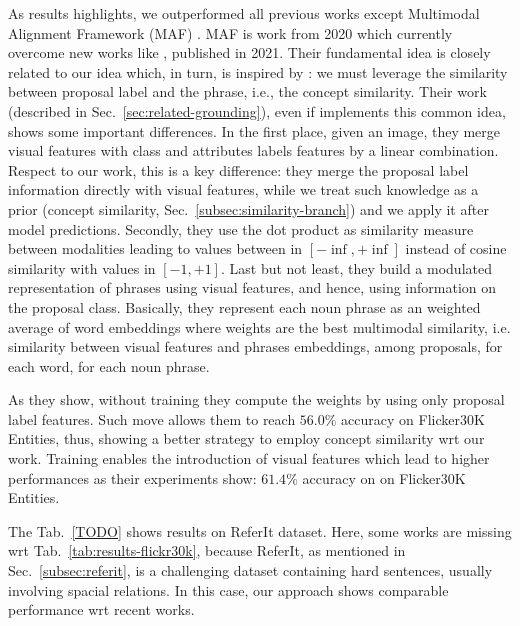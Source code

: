 As results highlights, we outperformed all previous works except
Multimodal Alignment Framework (MAF) \cite{wang2020maf}. MAF is work
from 2020 which currently overcome new works like
\cite{arbelle2021detector}, published in 2021. Their fundamental idea
is closely related to our idea which, in turn, is inspired by
\cite{wang2019phrase}: we must leverage the similarity between
proposal label and the phrase, i.e., the concept similarity. Their
work (described in Sec.~\ref{sec:related-grounding}), even if
implements this common idea, shows some important differences. In the
first place, given an image, they merge visual features with class and
attributes labels features by a linear combination. Respect to our
work, this is a key difference: they merge the proposal label
information directly with visual features, while we treat such
knowledge as a prior (concept similarity,
Sec.~\ref{subsec:similarity-branch}) and we apply it after model
predictions. Secondly, they use the dot product as similarity measure
between modalities leading to values between in $[-\inf, +\inf]$
instead of cosine similarity with values in $[-1, +1]$. Last but
not least, they build a modulated representation of phrases using
visual features, and hence, using information on the proposal class.
Basically, they represent each noun phrase as an weighted average of
word embeddings where weights are the best multimodal similarity, i.e.
similarity between visual features and phrases embeddings, among
proposals, for each word, for each noun phrase. 

As they show, without training they compute the weights by using only
proposal label features. Such move allows them to reach $56.0\%$
accuracy on Flicker30K Entities, thus, showing a better strategy to
employ concept similarity wrt our work. Training enables the
introduction of visual features which lead to higher performances as
their experiments show: $61.4\%$ accuracy on on Flicker30K Entities.

The Tab.~\ref{TODO} shows results on ReferIt dataset. Here, some works
are missing wrt Tab.~\ref{tab:results-flickr30k}, because ReferIt, as
mentioned in Sec.~\ref{subsec:referit}, is a challenging dataset
containing hard sentences, usually involving spacial relations. In
this case, our approach shows comparable performance wrt recent works.

